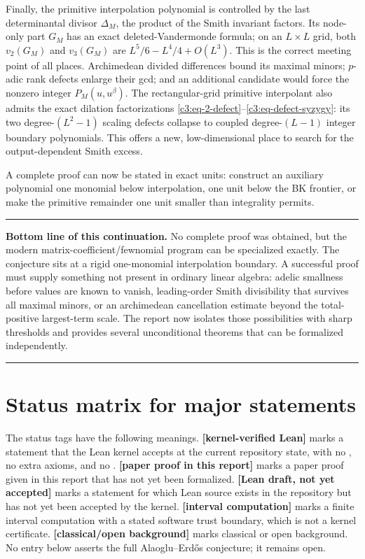 \documentclass[11pt,oneside]{article}
\theoremstyle{definition}
\theoremstyle{remark}
\newcommand{\lean}[1]{\texttt{\detokenize{#1}}}
\newcommand{\statuslean}{\textcolor{leanblue}{\textbf{[kernel-verified Lean]}}}
\newcommand{\statusnew}{\textcolor{newgreen}{\textbf{[paper proof in this report]}}}
\newcommand{\statuscomp}{\textcolor{computeviolet}{\textbf{[interval computation]}}}
\newcommand{\statusknown}{\textcolor{classicalgray}{\textbf{[classical/open background]}}}
\newcommand{\statusdraft}{\textcolor{computeviolet}{\textbf{[Lean draft, not yet accepted]}}}
\newenvironment{resultbox}
{\begin{center}\begin{minipage}{0.94\textwidth}\hrule\vspace{0.45em}}
{\vspace{0.35em}\hrule\end{minipage}\end{center}}
\begin{document}
Finally, the primitive interpolation polynomial is controlled by the last determinantal
divisor $\Delta_M$, the product of the Smith invariant factors.  Its node-only part $G_M$
has an exact deleted-Vandermonde formula; on an $L\times L$ grid, both
$v_2(G_M)$ and $v_3(G_M)$ are
$L^5/6-L^4/4+O(L^3)$.  This is the correct meeting
point of all places.  Archimedean divided differences bound its maximal minors; $p$-adic rank
defects enlarge their gcd; and an additional candidate would force the nonzero integer
$P_M(u,u^\beta)$.  The rectangular-grid primitive interpolant also admits the exact dilation factorizations
\eqref{c3:eq-2-defect}--\eqref{c3:eq-defect-syzygy}: its two degree-$(L^2-1)$ scaling
defects collapse to coupled degree-$(L-1)$ integer boundary polynomials.  This offers a new,
low-dimensional place to search for the output-dependent Smith excess.

A complete proof can now be stated in exact units: construct an auxiliary polynomial one
monomial below interpolation, one unit below the BK frontier, or make the primitive remainder
one unit smaller than integrality permits.

\begin{resultbox}
\textbf{Bottom line of this continuation.}
No complete proof was obtained, but the modern matrix-coefficient/fewnomial program can be
specialized exactly.  The conjecture sits at a rigid one-monomial interpolation boundary.  A
successful proof must supply something not present in ordinary linear algebra: adelic
smallness before values are known to vanish, leading-order Smith divisibility that survives
all maximal minors, or an archimedean cancellation estimate beyond the total-positive
largest-term scale.  The report now isolates those possibilities with sharp thresholds and
provides several unconditional theorems that can be formalized independently.
\end{resultbox}

\appendix

\section{Status matrix for major statements}
\label{app:status}

The status tags have the following meanings.  \statuslean{} marks a statement that the Lean
kernel accepts at the current repository state, with no \lean{sorry}, no extra axioms, and no
\lean{native_decide}.  \statusnew{} marks a paper proof given in this report that has not yet
been formalized.  \statusdraft{} marks a statement for which Lean source exists in the
repository but has not yet been accepted by the kernel.  \statuscomp{} marks a finite
interval computation with a stated software trust boundary, which is not a kernel
certificate.  \statusknown{} marks classical or open background.  No entry below asserts the
full Alaoglu--Erd\H{o}s conjecture; it remains open.
\end{document}
